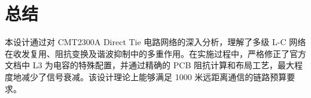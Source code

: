 \documentclass[a4paper,12pt]{article}
\begin{document}
	\section{总结}
	本设计通过对 CMT2300A Direct Tie 电路网络的深入分析，理解了多级 L-C 网络在收发复用、阻抗变换及谐波抑制中的多重作用。在实施过程中，严格修正了官方文档中 L3 为电容的特殊配置，并通过精确的 PCB 阻抗计算和布局工艺，最大程度地减少了信号衰减。该设计理论上能够满足 1000 米远距离通信的链路预算要求。
\end{document}
